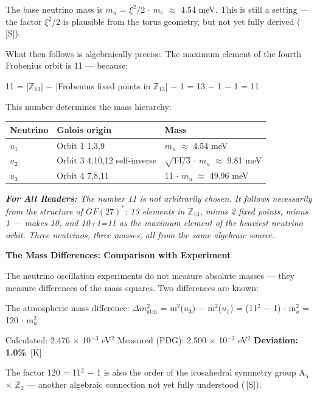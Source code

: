 \documentclass[11pt,oneside]{book}
\newcommand{\status}[1]{\penalty10000\,{\scriptsize\textcolor{gray!60}{[#1]}}}
\newenvironment{laierspur}{%
  \par\vspace{4pt}%
  \noindent\small\itshape\color{blue!60!black}%
  \textbf{For All Readers:}\enspace\ignorespaces}{%
  \par\vspace{4pt}\normalsize\normalfont\normalcolor}
\begin{document}
The base neutrino mass is $m_
u$ = $\xi^2$/2 $\cdot$ $m_e$ $\approx$ 4.54 meV. This is still
a setting — the factor $\xi^2$/2 is plausible from the torus geometry, but not
yet fully derived (\status{S}).

What then follows is algebraically precise. The maximum element of the fourth
Frobenius orbit is 11 — because:

11 = |$\mathbb{Z}_{13}$| $-$ |Frobenius fixed points in $\mathbb{Z}_{13}$| $-$ 1 = 13 $-$ 1 $-$ 1 = 11

This number determines the mass hierarchy:

\begin{center}
\small
\begin{tabular}{lp{2.8cm}p{3cm}}
\toprule
Neutrino & Galois origin & Mass \\
\midrule
$
u_1$ & Orbit 1 {1,3,9} & $m_
u$ $\approx$ 4.54 meV \\
$
u_2$ & Orbit 3 {4,10,12} self-inverse & $\sqrt{14/3}$ $\cdot$ $m_
u$ $\approx$ 9.81 meV \\
$
u_3$ & Orbit 4 {7,8,11} & 11 $\cdot$ $m_
u$ $\approx$ 49.96 meV \\
\bottomrule
\end{tabular}
\end{center}

\begin{laierspur}
The number 11 is not arbitrarily chosen. It follows necessarily from the
structure of $GF(27)^*$: 13 elements in $\mathbb{Z}_{13}$, minus 2 fixed points,
minus 1 — makes 10, and 10+1=11 as the maximum element of the heaviest
neutrino orbit. Three neutrinos, three masses, all from the same algebraic
source.
\end{laierspur}

\textbf{The Mass Differences: Comparison with Experiment}

The neutrino oscillation experiments do not measure absolute masses —
they measure differences of the mass squares. Two differences are known:

The atmospheric mass difference:
$\Delta m^2_\text{atm}$ = m$^2$($
u_3$) $-$ m$^2$($
u_1$) = (11$^2$ $-$ 1) $\cdot$ m$^2_
u$ = 120 $\cdot$ m$^2_
u$

Calculated: 2.476 $\times$ 10$^{-3}$ eV$^2$
Measured (PDG): 2.500 $\times$ 10$^{-3}$ eV$^2$
\textbf{Deviation: 1.0\%} \status{K}

The factor 120 = 11$^2$ $-$ 1 is also the order of the icosahedral symmetry
group A$_5$ $\times$ $\mathbb{Z}_2$ — another algebraic connection not yet fully
understood (\status{S}).
\end{document}
